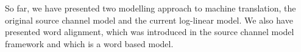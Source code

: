 


So far, we have presented two modelling approach to machine translation,
the original source channel model and the current log-linear model. We also
have presented word alignment, which was introduced in the source channel
model framework and which is a word based model.

